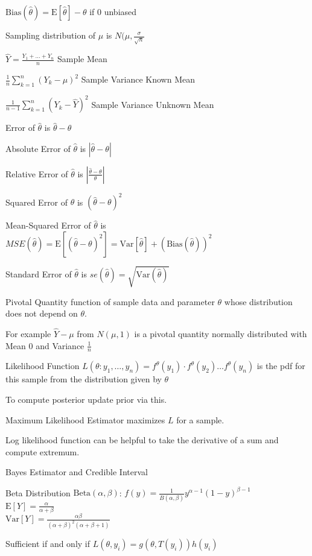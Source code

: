 $\text{Bias}(\hat{\theta})=\text{E}[\hat{\theta}]-\theta$ if $0$ unbiased

Sampling distribution of $\hat{\mu}$ is $N(\mu,\frac{\sigma}{\sqrt{n}}$

$\hat{Y}=\frac{Y_1+\dots +Y_n}{n}$ Sample Mean

$\frac{1}{n} \sum_{k=1}^n (Y_k-\mu)^2$ Sample Variance Known Mean

$\frac{1}{n-1} \sum_{k=1}^n (Y_k-\hat{Y})^2$ Sample Variance Unknown Mean

Error of $\hat{\theta}$ is $\hat{\theta}-\theta$

Absolute Error of $\hat{\theta}$ is $|\hat{\theta}-\theta|$

Relative Error of $\hat{\theta}$ is $|\frac{\hat{\theta}-\theta}{\theta}|$

Squared Error of $\hat{\theta}$ is $(\hat{\theta}-\theta)^2$

Mean-Squared Error of $\hat{\theta}$ is $MSE(\hat{\theta})=\text{E}[(\hat{\theta}-\theta)^2]=\text{Var}[\hat{\theta}]+(\text{Bias}(\hat{\theta}))^2$

Standard Error of $\hat{\theta}$ is $se(\hat{\theta})=\sqrt{\text{Var}(\hat{\theta})}$

Pivotal Quantity function of sample data and parameter $\theta$ whose distribution does not depend on $\theta$.

For example $\hat{Y}-\mu$ from $N(\mu,1)$ is a pivotal quantity normally distributed with Mean $0$ and Variance $\frac{1}{n}$

Likelihood Function $L(\theta : y_1, \dots , y_n)=f^{\theta}(y_1)\cdot f^{\theta}(y_2)\dots f^{\theta}(y_n)$ is the pdf for this sample from the distribution given by $\theta$

To compute posterior update prior via this.

Maximum Likelihood Estimator maximizes $L$ for a sample.

Log likelihood function can be helpful to take the derivative of a sum and compute extremum.

Bayes Estimator and Credible Interval

Beta Distribution $\text{Beta}(\alpha, \beta)$: $f(y)=\frac{1}{B(\alpha, \beta)} y^{\alpha -1}(1-y)^{\beta -1}$ \\
$\text{E}[Y]=\frac{\alpha}{\alpha +\beta}$ \\
$\text{Var}[Y]=\frac{\alpha \beta}{(\alpha +\beta)^2 (\alpha +\beta +1)}$

Sufficient if and only if $L(\theta, y_i)=g(\theta,T(y_i))h(y_i)$